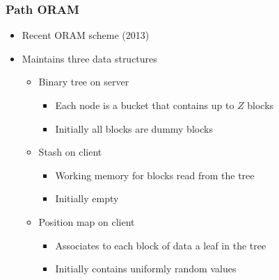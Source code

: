 \documentclass{beamer}
\begin{document}
\begin{frame}
    \frametitle{Path ORAM}
    \begin{itemize}
        \item Recent ORAM scheme (2013)
        \item Maintains three data structures
            \begin{itemize}
                \item Binary tree on server
                    \begin{itemize}
                        \item Each node is a bucket that contains up to $Z$ blocks
                        \item Initially all blocks are dummy blocks
                    \end{itemize}
                \item Stash on client
                    \begin{itemize}
                        \item Working memory for blocks read from the tree
                        \item Initially empty
                    \end{itemize}
                \item Position map on client
                    \begin{itemize}
                        \item Associates to each block of data a leaf in the tree
                        \item Initially contains uniformly random values
                    \end{itemize}
            \end{itemize}

    \end{itemize}
\end{frame}
\end{document}
